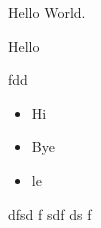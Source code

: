 \documentclass{article}
\begin{document}
Hello World.
\begin{comment}
 This is a comment too.
\end{comment}
Hello

\begin{comment}
 And so is this one
...

\end{comment}

fdd

\begin{itemize}
\item  Hi
\item  Bye
\item  le

\end{itemize}
dfsd
f
sdf
ds
f
\end{document}
